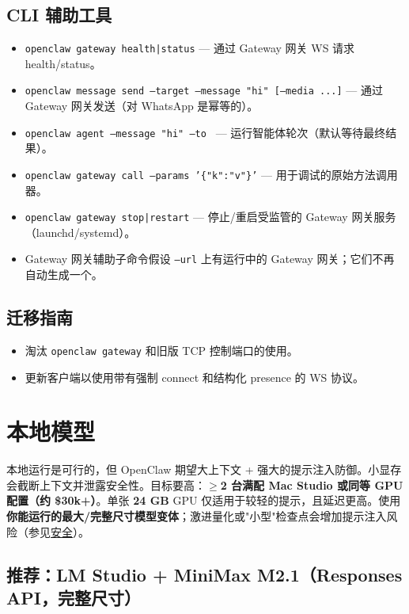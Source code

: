\subsection{CLI 辅助工具}


\begin{itemize}
  \item \texttt{openclaw gateway health|status} — 通过 Gateway 网关 WS 请求 health/status。
  \item \texttt{openclaw message send --target  --message "hi" [--media ...]} — 通过 Gateway 网关发送（对 WhatsApp 是幂等的）。
  \item \texttt{openclaw agent --message "hi" --to } — 运行智能体轮次（默认等待最终结果）。
  \item \texttt{openclaw gateway call  --params '\{"k":"v"\}'} — 用于调试的原始方法调用器。
  \item \texttt{openclaw gateway stop|restart} — 停止/重启受监管的 Gateway 网关服务（launchd/systemd）。
  \item Gateway 网关辅助子命令假设 \texttt{--url} 上有运行中的 Gateway 网关；它们不再自动生成一个。
\end{itemize}


\subsection{迁移指南}


\begin{itemize}
  \item 淘汰 \texttt{openclaw gateway} 和旧版 TCP 控制端口的使用。
  \item 更新客户端以使用带有强制 connect 和结构化 presence 的 WS 协议。
\end{itemize}



\clearpage

\section{本地模型}


本地运行是可行的，但 OpenClaw 期望大上下文 + 强大的提示注入防御。小显存会截断上下文并泄露安全性。目标要高：\textbf{$\geq$2 台满配 Mac Studio 或同等 GPU 配置（约 \$30k+）}。单张 \textbf{24 GB} GPU 仅适用于较轻的提示，且延迟更高。使用\textbf{你能运行的最大/完整尺寸模型变体}；激进量化或"小型"检查点会增加提示注入风险（参见\href{/gateway/security}{安全}）。

\subsection{推荐：LM Studio + MiniMax M2.1（Responses API，完整尺寸）}


